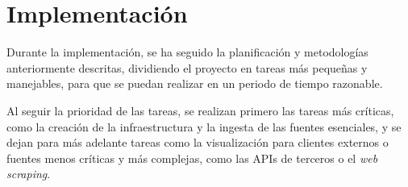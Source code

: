 \chapter{Implementación}
Durante la implementación, se ha seguido la planificación y metodologías
anteriormente descritas, dividiendo el proyecto en tareas más pequeñas y
manejables, para que se puedan realizar en un periodo de tiempo razonable.

Al seguir la prioridad de las tareas, se realizan primero las tareas más
críticas, como la creación de la infraestructura y la ingesta de las fuentes
esenciales, y se dejan para más adelante tareas como la visualización para
clientes externos o fuentes menos críticas y más complejas, como las APIs de
terceros o el \textit{web scraping}.

